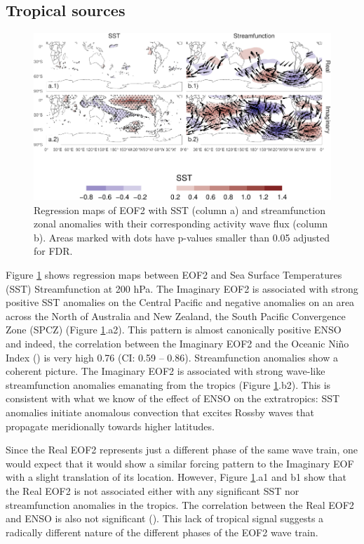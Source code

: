 \documentclass[smallextended]{svjour3}       %
\begin{document}
\hypertarget{tropical-sources}{%
\subsection{Tropical sources}\label{tropical-sources}}



\begin{figure}
\centering
\includegraphics{../figures/sst-psi-2-1.pdf}
\caption{\label{fig:sst-psi-2}Regression maps of EOF2 with SST (column a) and streamfunction zonal anomalies with their corresponding activity wave flux (column b). Areas marked with dots have p-values smaller than 0.05 adjusted for FDR.}
\end{figure}

Figure \ref{fig:sst-psi-2} shows regression maps between EOF2 and Sea Surface Temperatures (SST) Streamfunction at 200 hPa. The Imaginary EOF2 is associated with strong positive SST anomalies on the Central Pacific and negative anomalies on an area across the North of Australia and New Zealand, the South Pacific Convergence Zone (SPCZ) (Figure \ref{fig:sst-psi-2}.a2). This pattern is almost canonically positive ENSO and indeed, the correlation between the Imaginary EOF2 and the Oceanic Niño Index (\citep{bamston1997}) is very high 0.76 (CI: 0.59 -- 0.86). Streamfunction anomalies show a coherent picture. The Imaginary EOF2 is associated with strong wave-like streamfunction anomalies emanating from the tropics (Figure \ref{fig:sst-psi-2}.b2). This is consistent with what we know of the effect of ENSO on the extratropics: SST anomalies initiate anomalous convection that excites Rossby waves that propagate meridionally towards higher latitudes.

Since the Real EOF2 represents just a different phase of the same wave train, one would expect that it would show a similar forcing pattern to the Imaginary EOF with a slight translation of its location. However, Figure \ref{fig:sst-psi-2}.a1 and b1 show that the Real EOF2 is not associated either with any significant SST nor streamfunction anomalies in the tropics. The correlation between the Real EOF2 and ENSO is also not significant (). This lack of tropical signal suggests a radically different nature of the different phases of the EOF2 wave train.
\end{document}

